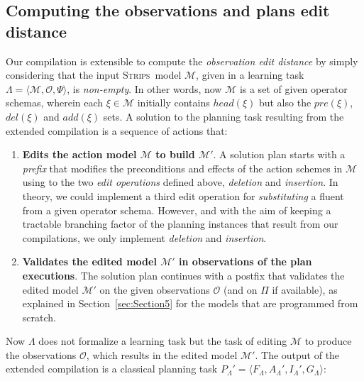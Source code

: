\documentclass[3p,times]{elsarticle}
\newcommand{\strips}{\textsc{Strips}}     %
\newcommand{\tup}[1]{{\langle #1 \rangle}}
\begin{document}
\subsection{Computing the observations and plans edit distance}
Our compilation is extensible to compute the {\em observation edit distance} by simply considering that the input \strips\ model $\mathcal{M}$, given in a learning task $\Lambda=\tup{\mathcal{M},\mathcal{O},\Psi}$, is {\em non-empty}. In other words, now $\mathcal{M}$ is a set of given operator schemas, wherein each $\xi\in\mathcal{M}$ initially contains $head(\xi)$ but also the $pre(\xi)$, $del(\xi)$ and $add(\xi)$ sets. A solution to the planning task resulting from the extended compilation is a sequence of actions that:

\begin{enumerate}
\item {\bf Edits the action model $\mathcal{M}$ to build $\mathcal{M}'$}. A solution plan starts with a {\em prefix} that modifies the preconditions and effects of the action schemes in $\mathcal{M}$ using to the two {\em edit operations} defined above, {\em deletion} and {\em insertion}. In theory, we could implement a third edit operation for {\em substituting} a fluent from a given operator schema. However, and with the aim of keeping a tractable branching factor of the planning instances that result from our compilations, we only implement {\em deletion} and {\em insertion}.
\item {\bf Validates the edited model $\mathcal{M}'$ in observations of the plan executions}. The solution plan continues with a postfix that validates the edited model $\mathcal{M}'$ on the given observations $\mathcal{O}$ (and on $\Pi$ if available), as explained in Section~\ref{sec:Section5} for the models that are programmed from scratch.
\end{enumerate}

Now $\Lambda$ does not formalize a learning task but the task of editing $\mathcal{M}$ to produce the observations $\mathcal{O}$, which results in the edited model $\mathcal{M}'$. The output of the extended compilation is a classical planning task $P_{\Lambda}'=\tup{F_{\Lambda},A_{\Lambda}',I_{\Lambda}',G_{\Lambda}}$:
\end{document}
